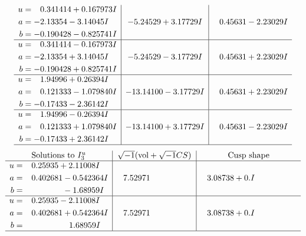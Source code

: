 \documentclass[1p]{elsarticle_modified}
\theoremstyle{definition}
\newcommand{\I}{\sqrt{-1}}
\begin{document}
$$\begin{array}{c|c|c}
\begin{aligned}
u &= \phantom{-}0.341414 + 0.167973 I \\
a &= -2.13354 - 3.14045 I \\
b &= -0.190428 - 0.825741 I\end{aligned}
 & -5.24529 + 3.17729 I & \phantom{-}0.45631 - 2.23029 I \\ \hline\begin{aligned}
u &= \phantom{-}0.341414 - 0.167973 I \\
a &= -2.13354 + 3.14045 I \\
b &= -0.190428 + 0.825741 I\end{aligned}
 & -5.24529 - 3.17729 I & \phantom{-}0.45631 + 2.23029 I \\ \hline\begin{aligned}
u &= \phantom{-}1.94996 + 0.26394 I \\
a &= \phantom{-}0.121333 - 1.079840 I \\
b &= -0.17433 - 2.36142 I\end{aligned}
 & -13.14100 - 3.17729 I & \phantom{-}0.45631 + 2.23029 I \\ \hline\begin{aligned}
u &= \phantom{-}1.94996 - 0.26394 I \\
a &= \phantom{-}0.121333 + 1.079840 I \\
b &= -0.17433 + 2.36142 I\end{aligned}
 & -13.14100 + 3.17729 I & \phantom{-}0.45631 - 2.23029 I\\
 \hline 
 \end{array}$$\newpage$$\begin{array}{c|c|c}  
\text{Solutions to }I^u_{3}& \I (\text{vol} + \sqrt{-1}CS) & \text{Cusp shape}\\
 \hline 
\begin{aligned}
u &= \phantom{-}0.25935 + 2.11008 I \\
a &= \phantom{-}0.402681 - 0.542364 I \\
b &= \phantom{-0.000000 } -1.68959 I\end{aligned}
 & \phantom{-}7.52971\phantom{ +0.000000I} & \phantom{-}3.08738 + 0. I\phantom{ +0.000000I} \\ \hline\begin{aligned}
u &= \phantom{-}0.25935 - 2.11008 I \\
a &= \phantom{-}0.402681 + 0.542364 I \\
b &= \phantom{-0.000000 -}1.68959 I\end{aligned}
 & \phantom{-}7.52971\phantom{ +0.000000I} & \phantom{-}3.08738 + 0. I\phantom{ +0.000000I}\\
 \hline 
 \end{array}$$\newpage\newpage\renewcommand{\arraystretch}{1}
\end{document}
